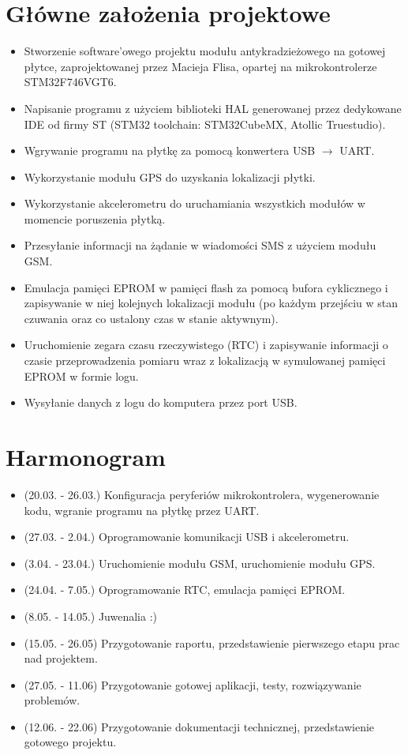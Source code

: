 \documentclass[10pt, a4paper]{article}
\begin{document}
\section{Główne założenia projektowe}
\begin{itemize}
\item Stworzenie software'owego projektu modułu antykradzieżowego na gotowej płytce, zaprojektowanej przez Macieja Flisa, opartej na mikrokontrolerze STM32F746VGT6.
\item Napisanie programu z użyciem biblioteki HAL generowanej przez dedykowane IDE od firmy ST (STM32 toolchain: STM32CubeMX, Atollic Truestudio).
\item Wgrywanie programu na płytkę za pomocą konwertera USB $\rightarrow$ UART.
\item Wykorzystanie modułu GPS do uzyskania lokalizacji płytki.
\item Wykorzystanie akcelerometru do uruchamiania wszystkich modułów w momencie poruszenia płytką.
\item Przesyłanie informacji na żądanie w wiadomości SMS z użyciem modułu GSM.
\item Emulacja pamięci EPROM w pamięci flash za pomocą bufora cyklicznego i zapisywanie w niej kolejnych lokalizacji modułu (po każdym przejściu w stan czuwania oraz co ustalony czas w stanie aktywnym).
\item Uruchomienie zegara czasu rzeczywistego (RTC) i zapisywanie informacji o czasie przeprowadzenia pomiaru wraz z lokalizacją w symulowanej pamięci EPROM w formie logu.
\item Wysyłanie danych z logu do komputera przez port USB.
\end{itemize}

\section{Harmonogram}
\begin{itemize}
\item (20.03. - 26.03.) Konfiguracja peryferiów mikrokontrolera, wygenerowanie kodu, wgranie programu na płytkę przez UART.
\item (27.03. - 2.04.) Oprogramowanie komunikacji USB i akcelerometru.
\item (3.04. - 23.04.) Uruchomienie modułu GSM, uruchomienie modułu GPS.
\item (24.04. - 7.05.) Oprogramowanie RTC, emulacja pamięci EPROM.
\item (8.05. - 14.05.) Juwenalia :)
\item (15.05. - 26.05) Przygotowanie raportu, przedstawienie pierwszego etapu prac nad projektem.
\item (27.05. - 11.06) Przygotowanie gotowej aplikacji, testy, rozwiązywanie problemów.
\item (12.06. - 22.06) Przygotowanie dokumentacji technicznej, przedstawienie gotowego projektu.
\end{itemize}
\end{document}
